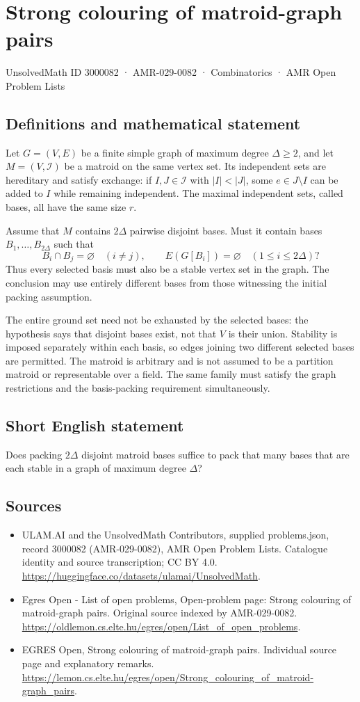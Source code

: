 \documentclass[11pt,a4paper]{article}
\begin{document}
\section*{Strong colouring of matroid-graph pairs}\label{3000082}
{\small UnsolvedMath ID 3000082 · AMR-029-0082 · Combinatorics · AMR Open Problem Lists}
\subsection{Definitions and mathematical statement}
Let $G=(V,E)$ be a finite simple graph of maximum degree $\Delta\ge2$,
and let $M=(V,\mathcal I)$ be a matroid on the same vertex set.
Its independent sets are hereditary and satisfy exchange: if
$I,J\in\mathcal I$ with $|I|<|J|$, some $e\in J\setminus I$ can be
added to $I$ while remaining independent. The maximal independent
sets, called bases, all have the same size $r$.

Assume that $M$ contains $2\Delta$ pairwise disjoint bases.
Must it contain bases $B_1,\ldots,B_{2\Delta}$ such that
\[
 B_i\cap B_j=\varnothing\quad(i\ne j),\qquad
                      E(G[B_i])=\varnothing\quad(1\le i\le2\Delta)?
\]
Thus every selected basis must also be a stable vertex set in the
graph. The conclusion may use entirely different bases from those
witnessing the initial packing assumption.

The entire ground set need not be exhausted by the selected bases:
the hypothesis says that disjoint bases exist, not that $V$ is their
union. Stability is imposed separately within each basis, so edges
joining two different selected bases are permitted. The matroid is
arbitrary and is not assumed to be a partition matroid or representable
over a field. The same family must satisfy the graph restrictions
and the basis-packing requirement simultaneously.
\subsection{Short English statement}
Does packing $2\Delta$ disjoint matroid bases suffice to pack
that many bases that are each stable in a graph of maximum degree $\Delta$?
\subsection{Sources}
\begin{itemize}
\item[S1] ULAM.AI and the UnsolvedMath Contributors, supplied problems.json, record 3000082 (AMR-029-0082), AMR Open Problem Lists. Catalogue identity and source transcription; CC BY 4.0.
\url{https://huggingface.co/datasets/ulamai/UnsolvedMath}.
\item[S2] Egres Open - List of open problems, Open-problem page: Strong colouring of matroid-graph pairs. Original source indexed by AMR-029-0082.
\url{https://oldlemon.cs.elte.hu/egres/open/List_of_open_problems}.
\item[S3] EGRES Open, Strong colouring of matroid-graph pairs. Individual source page and explanatory remarks.
\url{https://lemon.cs.elte.hu/egres/open/Strong_colouring_of_matroid-graph_pairs}.
\end{itemize}
\end{document}

